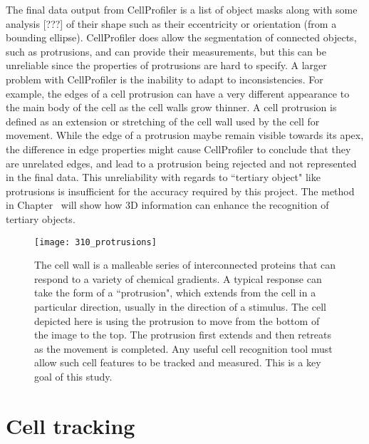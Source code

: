 The final data output from CellProfiler is a list of object masks along with some analysis [???] of their shape such as their eccentricity or orientation (from a bounding ellipse). CellProfiler does allow the segmentation of connected objects, such as protrusions, and can provide their measurements, but this can be unreliable since the properties of protrusions are hard to specify. A larger problem with CellProfiler is the inability to adapt to inconsistencies. For example, the edges of a cell protrusion can have a very different appearance to the main body of the cell as the cell walls grow thinner. A cell protrusion is defined as an extension or stretching of the cell wall used by the cell for movement. While the edge of a protrusion maybe remain visible towards its apex, the difference in edge properties might cause CellProfiler to conclude that they are unrelated edges, and lead to a protrusion being rejected and not represented in the final data. This unreliability with regards to ``tertiary object" like protrusions is insufficient for the accuracy required by this project. The method in Chapter~\cite{} will show how 3D information can enhance the recognition of tertiary objects.

\begin{figure}[h!]
 \centering
 \texttt{[image: 310\_protrusions]}
 \caption[Cell protrusion example]{
 	The cell wall is a malleable series of interconnected proteins that can respond to a variety of chemical gradients. A typical response can take the form of a ``protrusion", which extends from the cell in a particular direction, usually in the direction of a stimulus. The cell depicted here is using the protrusion to move from the bottom of the image to the top. The protrusion first extends and then retreats as the movement is completed. Any useful cell recognition tool must allow such cell features to be tracked and measured. This is a key goal of this study.
 }
 \label{fig:cellprotrusions}
\end{figure}

\section{Cell tracking}

